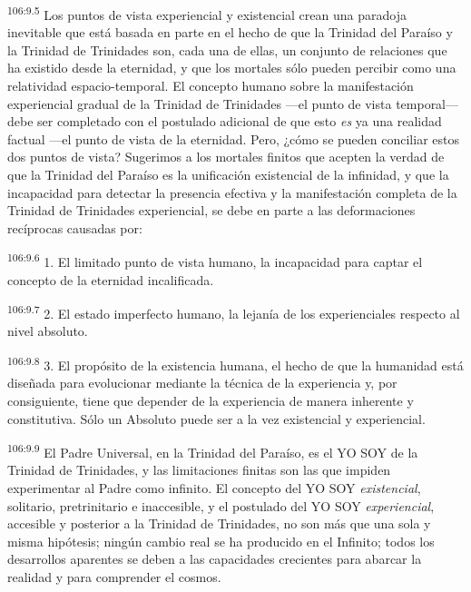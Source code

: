 \documentclass[twoside, 11pt]{book}
\begin{document}
\par
\textsuperscript{106:9.5} Los puntos de vista experiencial y existencial crean una paradoja inevitable que está basada en parte en el hecho de que la Trinidad del Paraíso y la Trinidad de Trinidades son, cada una de ellas, un conjunto de relaciones que ha existido desde la eternidad, y que los mortales sólo pueden percibir como una relatividad espacio-temporal. El concepto humano sobre la manifestación experiencial gradual de la Trinidad de Trinidades ---el punto de vista temporal--- debe ser completado con el postulado adicional de que esto \textit{es} ya una realidad factual ---el punto de vista de la eternidad. Pero, ¿cómo se pueden conciliar estos dos puntos de vista? Sugerimos a los mortales finitos que acepten la verdad de que la Trinidad del Paraíso es la unificación existencial de la infinidad, y que la incapacidad para detectar la presencia efectiva y la manifestación completa de la Trinidad de Trinidades experiencial, se debe en parte a las deformaciones recíprocas causadas por:

\par
\textsuperscript{106:9.6} 1. El limitado punto de vista humano, la incapacidad para captar el concepto de la eternidad incalificada.

\par
\textsuperscript{106:9.7} 2. El estado imperfecto humano, la lejanía de los experienciales respecto al nivel absoluto.

\par
\textsuperscript{106:9.8} 3. El propósito de la existencia humana, el hecho de que la humanidad está diseñada para evolucionar mediante la técnica de la experiencia y, por consiguiente, tiene que depender de la experiencia de manera inherente y constitutiva. Sólo un Absoluto puede ser a la vez existencial y experiencial.

\par
\textsuperscript{106:9.9} El Padre Universal, en la Trinidad del Paraíso, es el YO SOY de la Trinidad de Trinidades, y las limitaciones finitas son las que impiden experimentar al Padre como infinito. El concepto del YO SOY \textit{existencial}, solitario, pretrinitario e inaccesible, y el postulado del YO SOY \textit{experiencial}, accesible y posterior a la Trinidad de Trinidades, no son más que una sola y misma hipótesis; ningún cambio real se ha producido en el Infinito; todos los desarrollos aparentes se deben a las capacidades crecientes para abarcar la realidad y para comprender el cosmos.
\end{document}
